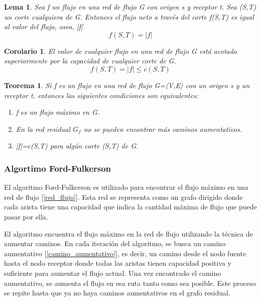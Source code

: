 \documentclass[10pt]{article} %
\newtheorem{thm}{Teorema}
\newtheorem{lem}{Lema}
\newtheorem{col}{Corolario}
\begin{document}
	\begin{lem}
		Sea f un flujo en una red de flujo G con origen s y receptor t. Sea (S,T) un corte cualquiera de G. Entonces el flujo neto a través del corte f(S,T) es igual al valor del flujo, osea, |f|
		\begin{equation}
			f(S,T) = |f|
		\end{equation}
	\end{lem}

	\begin{col}
		El valor de cualquier flujo en una red de flujo G está acotado superiormente por la capacidad de cualquier corte de G.
		\begin{equation}
			f(S,T) = |f| \leq c(S,T)
		\end{equation}
	\end{col}
	
	\begin{thm}
		Si f es un flujo en una red de flujo G=〈V,E〉 con un origen s y un receptor t, entonces las siguientes condiciones son equivalentes:
		\begin{enumerate}
			\item f es un flujo máximo en G. 
			\item En la red residual $G_f$ no se pueden encontrar más caminos aumentativos.
			\item  |f|=c(S,T) para algún corte (S,T) de G.
		\end{enumerate}
	\end{thm}

		\subsubsection{Algortimo Ford-Fulkerson}\label{ff}
	
	El algoritmo Ford-Fulkerson es utilizado para encontrar el flujo máximo en una red de flujo [\ref{red_flujo}]. Esta red se representa como un grafo dirigido donde cada arista tiene una capacidad que indica la cantidad máxima de flujo que puede pasar por ella.
	
	El algoritmo encuentra el flujo máximo en la red de flujo utilizando la técnica de aumentar caminos. En cada iteración del algoritmo, se busca un camino aumentativo [\ref{camino_aumentativo}], es decir, un camino desde el nodo fuente hasta el nodo receptor donde todas las aristas tienen capacidad positiva y suficiente para aumentar el flujo actual. Una vez encontrado el camino aumentativo, se aumenta el flujo en esa ruta tanto como sea posible. Este proceso se repite hasta que ya no haya caminos aumentativos en el grafo residual.
	
\end{document}

